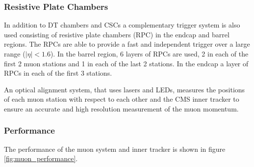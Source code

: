 \subsubsection{Resistive Plate Chambers}
In addition to DT chambers and CSCs a complementary trigger system is also used
consisting of resistive plate chambers (RPC) in the endcap and barrel regions.
The RPCs are able to provide a fast and independent trigger over a large range
($|\eta| < 1.6$). In the barrel region, 6 layers of RPCs are used, 2 in each of
the first 2 muon stations and 1 in each of the last 2 stations. In the endcap a
layer of RPCs in each of the first 3 stations.

An optical alignment system, that uses lasers and LEDs, measures the positions
of each muon station with respect to each other and the CMS inner tracker to
ensure an accurate and high resolution measurement of the muon
momentum.\cite{cms}

\subsubsection{Performance}
The performance of the muon system and inner tracker is shown in figure
\ref{fig:muon_performance}.

